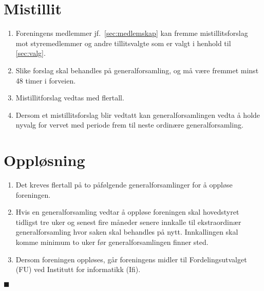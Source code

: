 \documentclass[8pt,norsk,a4paper]{article}
\begin{document}
\section{Mistillit}\label{sec:mistillit}
\begin{enumerate}
	\item{Foreningens medlemmer jf.~\ref{sec:medlemskap} kan fremme mistillitsforslag mot styremedlemmer og andre tillitsvalgte som er valgt i henhold til \ref{sec:valg}.}
	\item{Slike forslag skal behandles på generalforsamling, og må være fremmet minst 48 timer i forveien.}
	\item{Mistillitforslag vedtas med  flertall.}
	\item{Dersom et mistillitsforslag blir vedtatt kan generalforsamlingen vedta å holde nyvalg for vervet med periode frem til neste ordinære generalforsamling.}
\end{enumerate}

\section{Oppløsning}\label{sec:opplosning}
\begin{enumerate}
        \item{Det kreves  flertall på to påfølgende generalforsamlinger for å oppløse foreningen.}
        \item{Hvis en generalforsamling vedtar å oppløse foreningen skal hovedstyret tidligst tre uker og senest fire måneder senere innkalle til ekstraordinær generalforsamling hvor saken skal behandles på nytt. Innkallingen skal komme minimum to uker før generalforsamlingen finner sted.}
        \item{Dersom foreningen oppløses, går foreningens midler til Fordelingsutvalget (FU) ved Institutt for informatikk (Ifi).}
\end{enumerate}
$\blacksquare$
\end{document}
